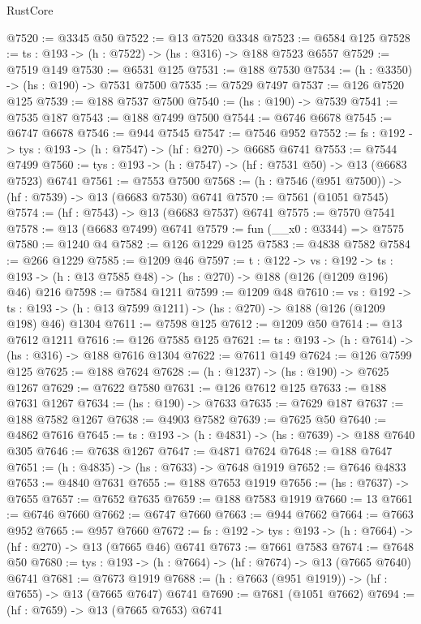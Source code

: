 \begin{lexlean}{RustCore}
\begin{coremodule}
@7520 := @3345 @50
@7522 := @13 @7520 @3348
@7523 := @6584 @125
@7528 := {ts : @193} -> (h : @7522) -> (hs : @316) -> @188 @7523 @6557
@7529 := @7519 @149
@7530 := @6531 @125
@7531 := @188 @7530
@7534 := (h : @3350) -> (hs : @190) -> @7531 @7500
@7535 := @7529 @7497
@7537 := @126 @7520 @125
@7539 := @188 @7537 @7500
@7540 := (hs : @190) -> @7539
@7541 := @7535 @187
@7543 := @188 @7499 @7500
@7544 := @6746 @6678
@7545 := @6747 @6678
@7546 := @944 @7545
@7547 := @7546 @952
@7552 := {fs : @192} -> {tys : @193} -> (h : @7547) -> (hf : @270) -> @6685 @6741
@7553 := @7544 @7499
@7560 := {tys : @193} -> (h : @7547) -> (hf : @7531 @50) -> @13 (@6683 @7523) @6741
@7561 := @7553 @7500
@7568 := (h : @7546 (@951 @7500)) -> (hf : @7539) -> @13 (@6683 @7530) @6741
@7570 := @7561 (@1051 @7545)
@7574 := (hf : @7543) -> @13 (@6683 @7537) @6741
@7575 := @7570 @7541
@7578 := @13 (@6683 @7499) @6741
@7579 := fun (__x0 : @3344) => @7575
@7580 := @1240 @4
@7582 := @126 @1229 @125
@7583 := @4838 @7582
@7584 := @266 @1229
@7585 := @1209 @46
@7597 := {t : @122} ->
  {vs : @192} ->
  {ts : @193} -> (h : @13 @7585 @48) -> (hs : @270) -> @188 (@126 (@1209 @196) @46) @216
@7598 := @7584 @1211
@7599 := @1209 @48
@7610 := {vs : @192} ->
  {ts : @193} -> (h : @13 @7599 @1211) -> (hs : @270) -> @188 (@126 (@1209 @198) @46) @1304
@7611 := @7598 @125
@7612 := @1209 @50
@7614 := @13 @7612 @1211
@7616 := @126 @7585 @125
@7621 := {ts : @193} -> (h : @7614) -> (hs : @316) -> @188 @7616 @1304
@7622 := @7611 @149
@7624 := @126 @7599 @125
@7625 := @188 @7624
@7628 := (h : @1237) -> (hs : @190) -> @7625 @1267
@7629 := @7622 @7580
@7631 := @126 @7612 @125
@7633 := @188 @7631 @1267
@7634 := (hs : @190) -> @7633
@7635 := @7629 @187
@7637 := @188 @7582 @1267
@7638 := @4903 @7582
@7639 := @7625 @50
@7640 := @4862 @7616
@7645 := {ts : @193} -> (h : @4831) -> (hs : @7639) -> @188 @7640 @305
@7646 := @7638 @1267
@7647 := @4871 @7624
@7648 := @188 @7647
@7651 := (h : @4835) -> (hs : @7633) -> @7648 @1919
@7652 := @7646 @4833
@7653 := @4840 @7631
@7655 := @188 @7653 @1919
@7656 := (hs : @7637) -> @7655
@7657 := @7652 @7635
@7659 := @188 @7583 @1919
@7660 := 13
@7661 := @6746 @7660
@7662 := @6747 @7660
@7663 := @944 @7662
@7664 := @7663 @952
@7665 := @957 @7660
@7672 := {fs : @192} -> {tys : @193} -> (h : @7664) -> (hf : @270) -> @13 (@7665 @46) @6741
@7673 := @7661 @7583
@7674 := @7648 @50
@7680 := {tys : @193} -> (h : @7664) -> (hf : @7674) -> @13 (@7665 @7640) @6741
@7681 := @7673 @1919
@7688 := (h : @7663 (@951 @1919)) -> (hf : @7655) -> @13 (@7665 @7647) @6741
@7690 := @7681 (@1051 @7662)
@7694 := (hf : @7659) -> @13 (@7665 @7653) @6741

\end{coremodule}
\end{lexlean}
